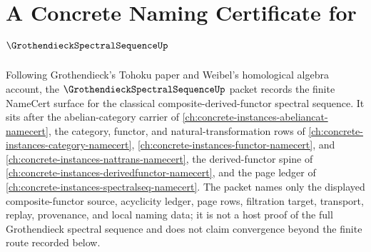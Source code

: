 \chapter{A Concrete Naming Certificate for $\GrothendieckSpectralSequenceUp$}
\label{ch:concrete-instances-grothendieck-spectral-sequence-namecert}

Following Grothendieck's Tohoku paper and Weibel's homological algebra account, the $\GrothendieckSpectralSequenceUp$ packet records the finite NameCert surface for the classical composite-derived-functor spectral sequence. It sits after the abelian-category carrier of \autoref{ch:concrete-instances-abeliancat-namecert}, the category, functor, and natural-transformation rows of \autoref{ch:concrete-instances-category-namecert}, \autoref{ch:concrete-instances-functor-namecert}, and \autoref{ch:concrete-instances-nattrans-namecert}, the derived-functor spine of \autoref{ch:concrete-instances-derivedfunctor-namecert}, and the page ledger of \autoref{ch:concrete-instances-spectralseq-namecert}. The packet names only the displayed composite-functor source, acyclicity ledger, page rows, filtration target, transport, replay, provenance, and local naming data; it is not a host proof of the full Grothendieck spectral sequence and does not claim convergence beyond the finite route recorded below.

